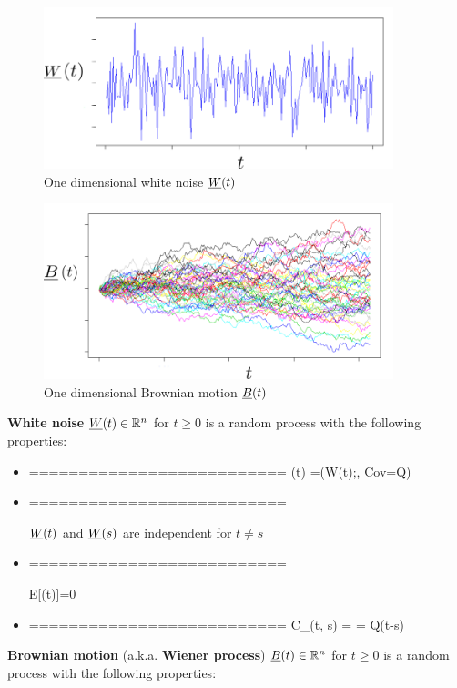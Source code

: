  \begin{figure}[h!]
 \centering
 \includegraphics[width=4in]
 {stochastic-diff-eqns/white-noise-labeled}
 \caption{One dimensional white noise $\rvW(t)$}
 \label{fig-white-noise-t}
 \end{figure}
 
 \begin{figure}[h!]
  \centering
  \includegraphics[width=4in]
  {stochastic-diff-eqns/brownian-motion-labeled}
  \caption{One dimensional Brownian motion $\rvB(t)$}
  \label{fig-brownian-motion-t}
  \end{figure}
  
 

{\bf White noise} $\rvW(t)
\in\RR^n$ for $t\geq 0$
is a random process with the
following properties:

\begin{itemize}
\item ==========================
\beq
\rvW(t) =\caln(W(t);, Cov=Q)
\eeq

\item ==========================

$\rvW(t)$ and $\rvW(s)$ are independent for
$t\neq s$

\item ==========================

\beq E[\rvW(t)]=0
\eeq

\item ==========================
\beq
C_\rvW(t, s) =  = Q\delta(t-s)
\eeq



\end{itemize}
{\bf Brownian motion} (a.k.a. {\bf Wiener process})
$\rvB(t)\in\RR^n$
for $t\geq 0$
is a random process with the
following properties: 


